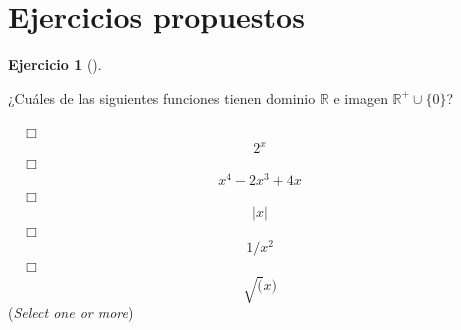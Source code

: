 \documentclass[
  a4paper,
]{scrreport}
\theoremstyle{definition}
\newtheorem{exercise}{Ejercicio}[chapter]
\theoremstyle{remark}
\begin{document}
\hypertarget{ejercicios-propuestos-1}{%
\section{Ejercicios propuestos}\label{ejercicios-propuestos-1}}

\begin{exercise}[]\protect\hypertarget{exr-dominio-imagen}{}\label{exr-dominio-imagen}

¿Cuáles de las siguientes funciones tienen dominio \(\mathbb{R}\) e
imagen \(\mathbb{R}^+\cup\{0\}\)?

${\quad\Box}$ $$2^x$$
${\quad\Box}$ $$x^4-2x^3+4x$$
${\quad\Box}$ $$|x|$$
${\quad\Box}$ $$1/x^2$$
${\quad\Box}$ $$\sqrt(x)$$
(\emph{Select one or more})

\end{exercise}
\end{document}
